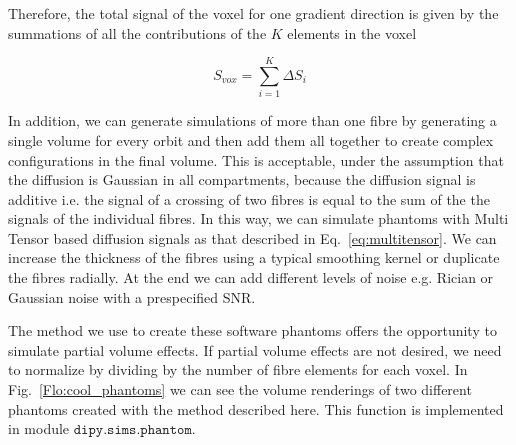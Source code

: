 \documentclass{bioinfo}
\begin{document}
\noindent Therefore, the total signal of the voxel for one gradient
direction is given by the summations of all the contributions of the
$K$ elements in the voxel

\begin{equation}
S_{vox}=\sum_{i=1}^{K}\Delta S_{i}\label{eq:digital_phantom_signal}\end{equation}


In addition, we can generate simulations of more than one fibre by
generating a single volume for every orbit and then add them all together
to create complex configurations in the final volume. This is acceptable,
under the assumption that the diffusion is Gaussian in all compartments,
because the diffusion signal is additive i.e. the signal of a crossing
of two fibres is equal to the sum of the the signals of the individual
fibres. In this way, we can simulate phantoms with Multi Tensor based
diffusion signals as that described in Eq.~\ref{eq:multitensor}.
We can increase the thickness of the fibres using a typical smoothing
kernel or duplicate the fibres radially. At the end we can add different
levels of noise e.g. Rician or Gaussian noise with a prespecified
SNR. 

The method we use to create these software phantoms offers the opportunity
to simulate partial volume effects. If partial volume effects are
not desired, we need to normalize by dividing by the number of fibre
elements for each voxel. In Fig.~\ref{Flo:cool_phantoms} we can
see the volume renderings of two different phantoms created with the
method described here. This function is implemented in module $\texttt{dipy.sims.phantom}$.
\end{document}
